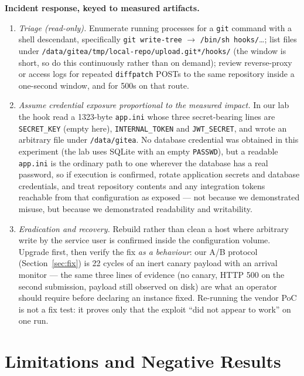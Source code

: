 \documentclass[journal]{IEEEtran}
\begin{document}
\textbf{Incident response, keyed to measured artifacts.}
\begin{enumerate}
\item \emph{Triage (read-only).} Enumerate running processes for a
\texttt{git} command with a shell descendant, specifically
\texttt{git write-tree} $\rightarrow$ \texttt{/bin/sh\allowbreak
hooks/}\ldots; list files under
\texttt{/data/gitea/tmp/\allowbreak local-repo/\allowbreak upload.git*/hooks/}
(the window is short, so do this continuously rather than on demand); review
reverse-proxy or access logs for repeated \texttt{diffpatch} POSTs to the same
repository inside a one-second window, and for 500s on that route.
\item \emph{Assume credential exposure proportional to the measured impact.}
In our lab the hook read a 1323-byte \texttt{app.ini} whose three secret-bearing
lines are \texttt{SECRET\_KEY} (empty here), \texttt{INTERNAL\_TOKEN} and
\texttt{JWT\_SECRET}, and wrote an arbitrary file under \texttt{/data/gitea}. No
database credential was obtained in this experiment (the lab uses SQLite with an
empty \texttt{PASSWD}), but a readable \texttt{app.ini} is the ordinary path to one
wherever the database has a real password, so if execution is confirmed, rotate
application secrets and database credentials,
and treat repository contents and any integration tokens reachable from that
configuration as exposed --- not because we demonstrated misuse, but because
we demonstrated readability and writability.
\item \emph{Eradication and recovery.} Rebuild rather than clean a host where
arbitrary write by the service user is confirmed inside the configuration
volume. Upgrade first, then verify the fix \emph{as a behaviour}: our A/B
protocol (Section~\ref{sec:fix}) is 22 cycles of an inert canary payload with
an arrival monitor --- the same three lines of evidence (no canary, HTTP 500
on the second submission, payload still observed on disk) are what an operator
should require before declaring an instance fixed. Re-running the vendor PoC
is not a fix test: it proves only that the exploit ``did not appear to work''
on one run.
\end{enumerate}

\section{Limitations and Negative Results}
\label{sec:limitations}
\end{document}
